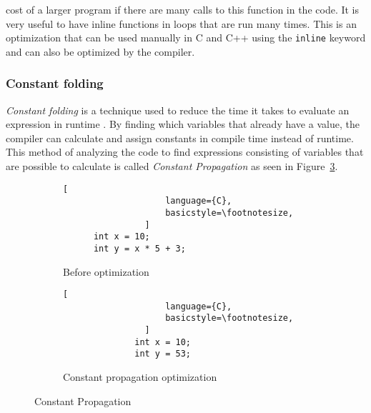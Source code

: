cost of a larger program if there are many calls to this function in the code. It is very useful to have inline functions in loops that are run many times. This is an optimization that can be used manually in C and C++ using the \texttt{inline} keyword and can also be optimized by the compiler.

\subsubsection{Constant folding}
\emph{Constant folding} is a technique used to reduce the time it takes to evaluate an expression in runtime \cite[p.~329]{muchnick1997advanced}. By finding which variables that already have a value, the compiler can calculate and assign constants in compile time instead of runtime. This method of analyzing the code to find expressions consisting of variables that are possible to calculate is called \emph{Constant Propagation} as seen in Figure~\ref{fig:constant:propagation}.

\begin{figure}[h]
    \centering
    \begin{adjustbox}{minipage=\linewidth,scale=1.0}
        \begin{subfigure}{.40\textwidth}
            \centering
            \begin{lstlisting}[
                    language={C},
                    basicstyle=\footnotesize,
                ]
      int x = 10;
      int y = x * 5 + 3;
                \end{lstlisting}
            \caption{Before optimization}
            \label{fig:propagation:sub1}
        \end{subfigure}%
        \begin{subfigure}{.50\textwidth}
            \centering
            \begin{lstlisting}[
                    language={C},
                    basicstyle=\footnotesize,
                ]
              int x = 10;
              int y = 53;
                \end{lstlisting}
            \caption{Constant propagation optimization}
            \label{fig:propagation:sub2}
        \end{subfigure}
    \end{adjustbox}
    \caption{Constant Propagation}
    \label{fig:constant:propagation}
\end{figure}

